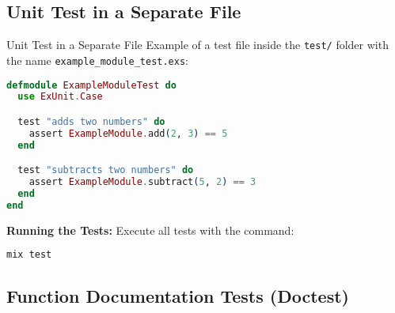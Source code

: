 \documentclass[aspectratio=169, table]{beamer}
\begin{document}
\subsection{Unit Test in a Separate File}
\begin{frame}[fragile]{Unit Test in a Separate File}
\vspace{20pt}
Example of a test file inside the \texttt{test/} folder  
with the name \texttt{example\_module\_test.exs}:  

\begin{lstlisting}[language=Elixir, basicstyle=\ttfamily\scriptsize]
defmodule ExampleModuleTest do
  use ExUnit.Case

  test "adds two numbers" do
    assert ExampleModule.add(2, 3) == 5
  end

  test "subtracts two numbers" do
    assert ExampleModule.subtract(5, 2) == 3
  end
end
\end{lstlisting}

\textbf{Running the Tests:} Execute all tests with the command:  
\begin{lstlisting}[language=bash]
mix test
\end{lstlisting}
\end{frame}

\subsection{Function Documentation Tests (Doctest)}
\end{document}
